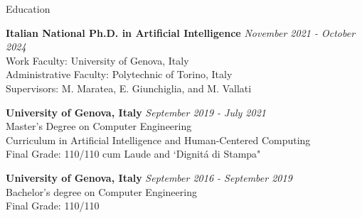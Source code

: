 \documentclass{resume} %
\begin{document}

\begin{rSection}{Education}

{\bf  Italian National Ph.D. in Artificial Intelligence} \hfill {\em November 2021 - \textit{October 2024}} \\ 
Work Faculty: University of Genova, Italy\\
Administrative Faculty: Polytechnic of Torino, Italy\\
Supervisors: M. Maratea, E. Giunchiglia, and M. Vallati

{\bf University of Genova, Italy} \hfill {\em September 2019 - July 2021} \\ 
Master's Degree on Computer Engineering \\
Curriculum in Artificial Intelligence and Human-Centered Computing \\
Final Grade: 110/110 cum Laude and `Dignit\'a di Stampa" 

{\bf University of Genova, Italy} \hfill {\em September 2016 - September 2019} \\ 
Bachelor's degree on Computer Engineering \\
Final Grade: 110/110 
\end{rSection}


\end{document}
